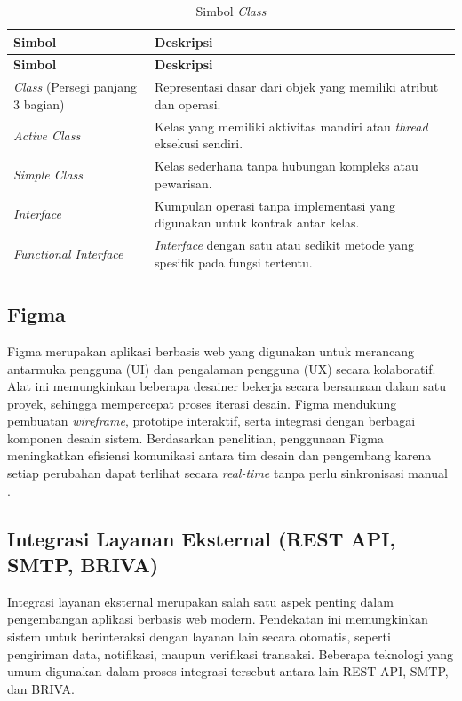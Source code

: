 \begin{longtable}{|p{}|p{}|}
	\caption{Simbol \textit{Class}}
	\label{table:2.simbolClass}\\
	\hline
	\textbf{Simbol} & \textbf{Deskripsi} \\
	\hline
	\endfirsthead
	\hline
	\textbf{Simbol} & \textbf{Deskripsi} \\
	\hline
	\endhead
	\textit{Class} (Persegi panjang 3 bagian) & Representasi dasar dari objek yang memiliki atribut dan operasi. \\
	\hline
	\textit{Active Class} & Kelas yang memiliki aktivitas mandiri atau \textit{thread} eksekusi sendiri. \\
	\hline
	\textit{Simple Class} & Kelas sederhana tanpa hubungan kompleks atau pewarisan. \\
	\hline
	\textit{Interface} & Kumpulan operasi tanpa implementasi yang digunakan untuk kontrak antar kelas. \\
	\hline
	\textit{Functional Interface} & \textit{Interface} dengan satu atau sedikit metode yang spesifik pada fungsi tertentu. \\
	\hline
\end{longtable}

\subsection{Figma} \label{II.Figma}
Figma merupakan aplikasi berbasis web yang digunakan untuk merancang antarmuka pengguna (UI) dan pengalaman pengguna (UX) secara kolaboratif. Alat ini memungkinkan beberapa desainer bekerja secara bersamaan dalam satu proyek, sehingga mempercepat proses iterasi desain. Figma mendukung pembuatan \textit{wireframe}, prototipe interaktif, serta integrasi dengan berbagai komponen desain sistem. Berdasarkan penelitian, penggunaan Figma meningkatkan efisiensi komunikasi antara tim desain dan pengembang karena setiap perubahan dapat terlihat secara \textit{real-time} tanpa perlu sinkronisasi manual \cite{arifin2022implementasi}.\par

\subsection{Integrasi Layanan Eksternal (REST API, SMTP, BRIVA)} \label{II.IntegrasiLayanan}
Integrasi layanan eksternal merupakan salah satu aspek penting dalam pengembangan aplikasi berbasis web modern. Pendekatan ini memungkinkan sistem untuk berinteraksi dengan layanan lain secara otomatis, seperti pengiriman data, notifikasi, maupun verifikasi transaksi. Beberapa teknologi yang umum digunakan dalam proses integrasi tersebut antara lain REST API, SMTP, dan BRIVA.\par

